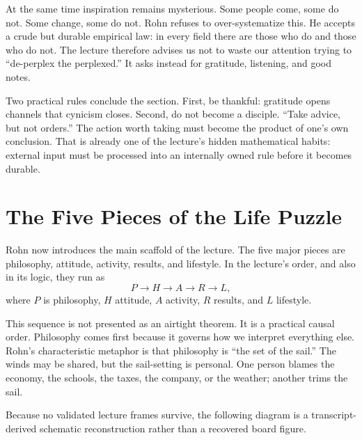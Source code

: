 At the same time inspiration remains mysterious. Some people come, some do not. Some change, some do not. Rohn refuses to over-systematize this. He accepts a crude but durable empirical law: in every field there are those who do and those who do not. The lecture therefore advises us not to waste our attention trying to ``de-perplex the perplexed.'' It asks instead for gratitude, listening, and good notes.

Two practical rules conclude the section. First, be thankful: gratitude opens channels that cynicism closes. Second, do not become a disciple. ``Take advice, but not orders.'' The action worth taking must become the product of one's own conclusion. That is already one of the lecture's hidden mathematical habits: external input must be processed into an internally owned rule before it becomes durable.

\section{The Five Pieces of the Life Puzzle}

Rohn now introduces the main scaffold of the lecture. The five major pieces are philosophy, attitude, activity, results, and lifestyle. In the lecture's order, and also in its logic, they run as
\begin{equation}
P \to H \to A \to R \to L,
\end{equation}
where \(P\) is philosophy, \(H\) attitude, \(A\) activity, \(R\) results, and \(L\) lifestyle.

This sequence is not presented as an airtight theorem. It is a practical causal order. Philosophy comes first because it governs how we interpret everything else. Rohn's characteristic metaphor is that philosophy is ``the set of the sail.'' The winds may be shared, but the sail-setting is personal. One person blames the economy, the schools, the taxes, the company, or the weather; another trims the sail.

Because no validated lecture frames survive, the following diagram is a transcript-derived schematic reconstruction rather than a recovered board figure.

